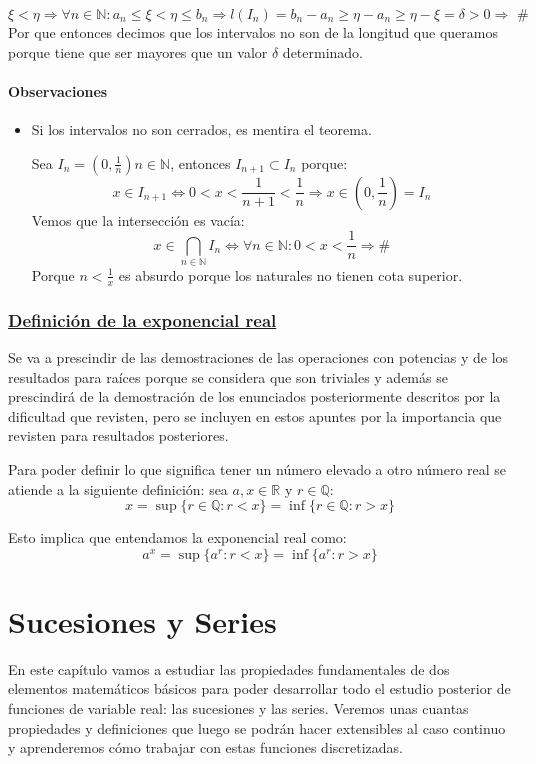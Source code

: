 \documentclass[10pt,a4paper,openright]{book}
\theoremstyle{break}
\begin{document}
\begin{itemize}
$$\xi<\eta\Rightarrow \forall n \in \mathbb N: a_n\leq \xi<\eta\leq b_n\Rightarrow l(I_n)=b_n-a_n\geq \eta-a_n\geq \eta-\xi=\delta>0\Rightarrow \mbox{ \#}$$
Por que entonces decimos que los intervalos no son de la longitud que queramos porque tiene que ser mayores que un valor $\delta$ determinado.

\end{itemize}

\subsubsection{Observaciones}
\begin{itemize}
\item Si los intervalos no son cerrados, es mentira el teorema.\par
Sea $I_n=\left(0,\frac{1}{n}\right) n\in \mathbb N$, entonces $I_{n+1}\subset I_n$ porque:
$$x\in I_{n+1}\Leftrightarrow 0<x<\frac{1}{n+1}<\frac{1}{n}\Rightarrow x\in \left(0,\frac{1}{n}\right)=I_n$$
Vemos que la intersección es vacía:
$$x\in \bigcap_{n\in \mathbb N}I_n\Leftrightarrow \forall n \in \mathbb N: 0<x<\frac{1}{n}\Rightarrow \#$$
Porque $n<\frac{1}{x}$ es absurdo porque los naturales no tienen cota superior.
\end{itemize}

\subsection{\underline{Definición de la exponencial real}}
Se va a prescindir de las demostraciones de las operaciones con potencias y de los resultados para raíces porque se considera que son triviales y además se prescindirá de la demostración de los enunciados posteriormente descritos por la dificultad que revisten, pero se incluyen en estos apuntes por la importancia que revisten para resultados posteriores.

Para poder definir lo que significa tener un número elevado a otro número real se atiende a la siguiente definición: sea $a,x\in \mathbb R$ y $r\in \mathbb Q$:
$$x=\sup\{r\in \mathbb Q: r<x\}=\inf\{r\in \mathbb Q: r>x\}$$

Esto implica que entendamos la exponencial real como:
$$a^x=\sup\{a^r: r<x\}=\inf\{a^r: r>x\}$$

\chapter{Sucesiones y Series}
En este capítulo vamos a estudiar las propiedades fundamentales de dos elementos matemáticos básicos para poder desarrollar todo el estudio posterior de funciones de variable real: las sucesiones y las series. Veremos unas cuantas propiedades y definiciones que luego se podrán hacer extensibles al caso continuo y aprenderemos cómo trabajar con estas funciones discretizadas.
\end{document}
